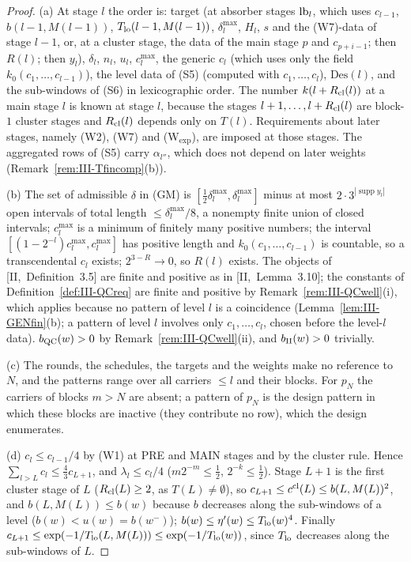 \documentclass[10pt]{amsart}
\theoremstyle{definition}
\theoremstyle{remark}
\newcommand{\supp}{\operatorname{supp}}
\begin{document}
\begin{proof}
(a) At stage $l$ the order is: target (at absorber stages ${\rm lb}_l$, which
uses $c_{l-1}$, $b(l-1,M(l-1))$, $T_{\rm lo}(l-1,M(l-1))$, $\delta^{\max}_l$, $H_l$,
$s$ and the (W7)-data of stage $l-1$, or, at a cluster stage, the data of the
main stage $p$ and $c_{p+i-1}$; then $R(l)$; then $y_l$), $\delta_l$, $n_l$,
$u_l$, $c^{\max}_l$, the generic $c_l$ (which uses only the field
$k_0(c_1,\dots,c_{l-1})$), the level data of (S5) (computed with $c_1,\dots,c_l$),
$\mathrm{Des}(l)$, and the sub-windows of (S6) in lexicographic order.  The number
$k(l+R_{\rm cl}(l))$ at a main stage $l$ is known at stage $l$, because the
stages $l+1,\dots,l+R_{\rm cl}(l)$ are block-$1$ cluster stages and $R_{\rm cl}(l)$
depends only on $T(l)$.  Requirements about later stages, namely (W2), (W7) and
(W$_{\exp}$), are imposed at those stages.  The aggregated rows of (S5) carry
$\alpha_{l''}$, which does not depend on later weights
(Remark~\ref{rem:III-Tfincomp}(b)).

(b) The set of admissible $\delta$ in (GM) is $[\frac12\delta^{\max}_l,
\delta^{\max}_l]$ minus at most $2\cdot3^{|\supp y_l|}$ open intervals of total
length $\le\delta^{\max}_l/8$, a nonempty finite union of closed intervals;
$c^{\max}_l$ is a minimum of finitely many positive numbers; the interval
$[(1-2^{-l})c^{\max}_l,c^{\max}_l]$ has positive length and $k_0(c_1,\dots,
c_{l-1})$ is countable, so a transcendental $c_l$ exists; $2^{3-R}\to0$, so
$R(l)$ exists.  The objects of [II,~Definition~3.5] are finite and positive as in
[II,~Lemma~3.10]; the constants of Definition~\ref{def:III-QCreq} are finite and
positive by Remark~\ref{rem:III-QCwell}(i), which applies because no pattern of
level $l$ is a coincidence (Lemma~\ref{lem:III-GENfin}(b); a pattern of level $l$
involves only $c_1,\dots,c_l$, chosen before the level-$l$ data).  $b_{\rm QC}(w)
>0$ by Remark~\ref{rem:III-QCwell}(ii), and $b_{\rm II}(w)>0$ trivially.

(c) The rounds, the schedules, the targets and the weights make no reference
to $N$, and the patterns range over all carriers $\le l$ and their blocks.  For
$p_N$ the carriers of blocks $m>N$ are absent; a pattern of $p_N$ is the design
pattern in which these blocks are inactive (they contribute no row), which the
design enumerates.

(d) $c_l\le c_{l-1}/4$ by (W1) at PRE and MAIN stages and by the cluster rule.
Hence $\sum_{l>L}c_l\le\frac43c_{L+1}$, and $\lambda_l\le c_l/4$
($m2^{-m}\le\frac12$, $2^{-k}\le\frac12$).  Stage $L+1$ is the first cluster
stage of $L$ ($R_{\rm cl}(L)\ge2$, as $T(L)\ne\emptyset$), so $c_{L+1}\le
c^{\rm cl}(L)\le b(L,M(L))^2$, and $b(L,M(L))\le b(w)$ because $b$ decreases
along the sub-windows of a level ($b(w)<u(w)=b(w^-)$); $b(w)\le\eta'(w)\le
T_{\rm lo}(w)^4$.  Finally $c_{L+1}\le\exp(-1/T_{\rm lo}(L,M(L)))\le\exp(-1/T_{\rm lo}
(w))$, since $T_{\rm lo}$ decreases along the sub-windows of $L$.


\end{proof}
\end{document}
